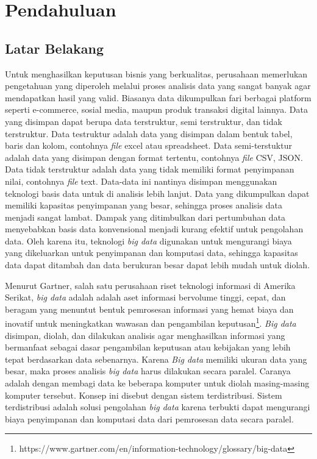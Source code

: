 \chapter{Pendahuluan}
\label{chap:intro}
   
\section{Latar Belakang}
\label{sec:label}


Untuk menghasilkan keputusan bisnis yang berkualitas, perusahaan memerlukan pengetahuan  yang diperoleh melalui proses analisis data yang sangat banyak agar mendapatkan hasil yang valid. Biasanya data dikumpulkan fari berbagai platform seperti e-commerce, sosial media, maupun produk transaksi digital lainnya. Data yang disimpan dapat berupa data terstruktur, semi terstruktur, dan tidak terstruktur. Data testruktur adalah data yang disimpan dalam bentuk tabel, baris dan kolom, contohnya {\it file} excel atau spreadsheet. Data semi-terstuktur adalah data yang disimpan dengan format tertentu, contohnya {\it file} CSV, JSON. Data tidak terstruktur adalah data yang tidak memiliki format penyimpanan nilai, contohnya {\it file} text. Data-data ini nantinya disimpan menggunakan teknologi basis data untuk di analisis lebih lanjut. Data yang dikumpulkan dapat memiliki kapasitas penyimpanan yang besar, sehingga proses analisis data menjadi sangat lambat. Dampak yang ditimbulkan dari pertumbuhan data menyebabkan basis data konvensional menjadi kurang efektif untuk pengolahan data. Oleh karena itu, teknologi \textit{big data} digunakan untuk mengurangi biaya yang dikeluarkan untuk penyimpanan dan komputasi data, sehingga kapasitas data dapat ditambah dan data berukuran besar dapat lebih mudah untuk diolah.

Menurut Gartner, salah satu perusahaan riset teknologi informasi di Amerika Serikat, {\it big data} adalah adalah aset informasi bervolume tinggi, cepat, dan beragam yang menuntut bentuk pemrosesan informasi yang hemat biaya dan inovatif untuk meningkatkan wawasan dan pengambilan keputusan\footnote{https://www.gartner.com/en/information-technology/glossary/big-data}. {\it Big data} disimpan, diolah, dan dilakukan analisis agar menghasilkan informasi yang bermanfaat sebagai dasar pengambilan keputusan atau kebijakan yang lebih tepat berdasarkan data sebenarnya. Karena {\it Big data} memiliki ukuran data yang besar, maka proses analisis \textit{big data} harus dilakukan secara paralel. Caranya adalah dengan membagi data ke beberapa komputer untuk diolah masing-masing komputer tersebut. Konsep ini disebut dengan sistem terdistribusi. Sistem terdistribusi adalah solusi pengolahan \textit{big data} karena terbukti dapat mengurangi biaya penyimpanan dan komputasi data dari pemrosesan data secara paralel. 

